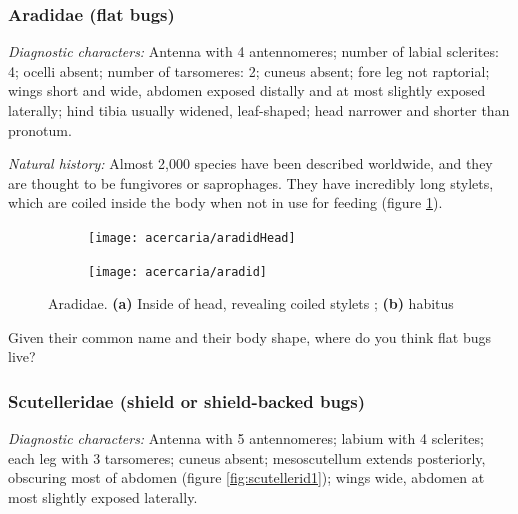 \subsubsection{Aradidae (flat bugs)}
\noindent{}\textit{Diagnostic characters:} Antenna with 4 antennomeres; number of labial sclerites: 4; ocelli absent; number of tarsomeres: 2; cuneus absent; fore leg not raptorial; wings short and wide, abdomen exposed distally and at most slightly exposed laterally; hind tibia usually widened, leaf-shaped; head narrower and shorter than pronotum.\vspace{3mm}

\noindent{}\textit{Natural history:} Almost 2,000 species have been described worldwide, and they are thought to be fungivores or saprophages. They have incredibly long stylets, which are coiled inside the body when not in use for feeding (figure \ref{fig:aradid2}).\vspace{3mm}

\begin{figure}[ht!]
 \centering
  \begin{subfigure}[ht!]{0.35\textwidth}
  \texttt{[image: acercaria/aradidHead]}
  \caption{}
  \label{fig:aradid2}
 \end{subfigure}
  \hfill
 \begin{subfigure}[ht!]{0.5\textwidth}
  \texttt{[image: acercaria/aradid]}
  \caption{}
  \label{fig:aradid1}
 \end{subfigure}
 \caption{Aradidae. \textbf{(a)} Inside of head, revealing coiled stylets \citep[redrawn from][Fig. 1]{Spooner121}; \textbf{(b)} habitus \citep[modified from][Fig. 1A]{deyrup2004natural}}\label{fig:aradids}
\end{figure}

\begin{theo}
{}Given their common name and their body shape, where do you think flat bugs live?
\end{theo}

\subsubsection{Scutelleridae (shield or shield-backed bugs)}
\noindent{}\textit{Diagnostic characters:} Antenna with 5 antennomeres; labium with 4 sclerites; each leg with 3 tarsomeres; cuneus absent; mesoscutellum extends posteriorly, obscuring most of abdomen (figure \ref{fig:scutellerid1}); wings wide, abdomen at most slightly exposed laterally.\vspace{3mm}


